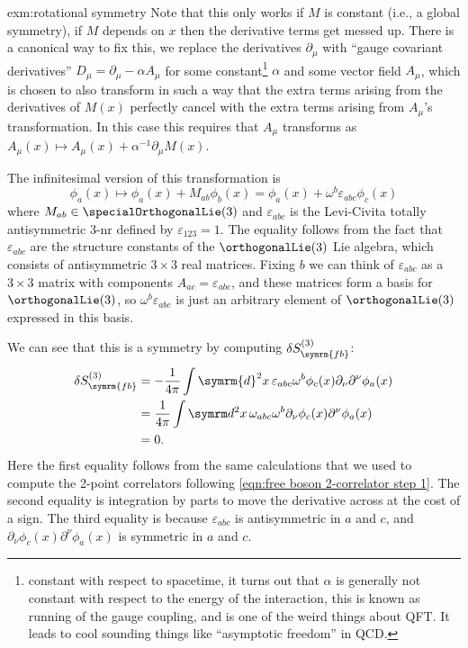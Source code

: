 \documentclass[fleqn]{NotesClass}
\renewcommand{\dl}[1]{\symrm{d}#1}
\newcommand{\freeboson}{\symrm{fb}}
\begin{document}
\begin{exm}{}{exm:rotational symmetry}
        Note that this only works if \(M\) is constant (i.e., a global symmetry), if \(M\) depends on \(x\) then the derivative terms get messed up.
        There is a canonical way to fix this, we replace the derivatives \(\partial_\mu\) with \enquote{gauge covariant derivatives} \(D_\mu = \partial_\mu - \alpha A_\mu\) for some constant\footnote{constant with respect to spacetime, it turns out that \(\alpha\) is generally not constant with respect to the energy of the interaction, this is known as running of the gauge coupling, and is one of the weird things about QFT. It leads to cool sounding things like \enquote{asymptotic freedom} in QCD.} \(\alpha\) and some vector field \(A_\mu\), which is chosen to also transform in such a way that the extra terms arising from the derivatives of \(M(x)\) perfectly cancel with the extra terms arising from \(A_\mu\)'s transformation.
        In this case this requires that \(A_\mu\) transforms as \(A_\mu(x) \mapsto A_\mu(x) + \alpha^{-1}\partial_\mu M(x)\).
        
        The infinitesimal version of this transformation is
        \begin{equation}
            \phi_a(x) \mapsto \phi_a(x) + M_{ab}\phi_b(x) = \phi_a(x) + \omega^b \varepsilon_{abc} \phi_c(x)
        \end{equation}
        where \(M_{ab} \in \specialOrthogonalLie(3)\) and \(\varepsilon_{abc}\) is the Levi-Civita totally antisymmetric 3-nr defined by \(\varepsilon_{123} = 1\).
        The equality follows from the fact that \(\varepsilon_{abc}\) are the structure constants of the \(\orthogonalLie(3)\) Lie algebra, which consists of antisymmetric \(3 \times 3\) real matrices.
        Fixing \(b\) we can think of \(\varepsilon_{abc}\) as a \(3 \times 3\) matrix with components \(A_{ac} = \varepsilon_{abc}\), and these matrices form a basis for \(\orthogonalLie(3)\), so \(\omega^b\varepsilon_{abc}\) is just an arbitrary element of \(\orthogonalLie(3)\) expressed in this basis.
        
        We can see that this is a symmetry by computing \(\delta S_{\freeboson}^{(3)}\):
        \begin{align}
            \delta S_{\freeboson}^{(3)} &= - \frac{1}{4\pi} \int \dl{^2x} \, \varepsilon_{abc} \omega^b \phi_c(x) \partial_\nu \partial^\nu \phi_a(x)\\
            &= \frac{1}{4\pi} \int \dl^2x \, \omega_{abc} \omega^b \partial_\nu \phi_c(x) \partial^\nu \phi_a(x)\\
            &= 0.
        \end{align}
        Here the first equality follows from the same calculations that we used to compute the 2-point correlators following \cref{eqn:free boson 2-correlator step 1}.
        The second equality is integration by parts to move the derivative across at the cost of a sign.
        The third equality is because \(\varepsilon_{abc}\) is antisymmetric in \(a\) and \(c\), and \(\partial_\nu \phi_c(x) \partial^\nu \phi_a(x)\) is symmetric in \(a\) and \(c\).
    \end{exm}
    
\end{document}
